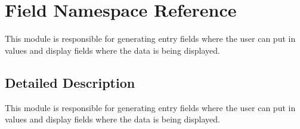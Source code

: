 \hypertarget{namespaceField}{}\section{Field Namespace Reference}
\label{namespaceField}


This module is responsible for generating entry fields where the user can put in values and display fields where the data is being displayed.  




\subsection{Detailed Description}
This module is responsible for generating entry fields where the user can put in values and display fields where the data is being displayed. 